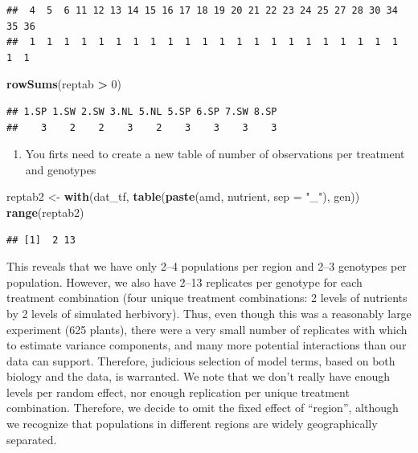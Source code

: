 \documentclass[
  12pt,
]{book}
\newenvironment{Shaded}{\begin{snugshade}}{\end{snugshade}}
\newcommand{\DataTypeTok}[1]{\textcolor[rgb]{0.13,0.29,0.53}{#1}}
\newcommand{\DecValTok}[1]{\textcolor[rgb]{0.00,0.00,0.81}{#1}}
\newcommand{\KeywordTok}[1]{\textcolor[rgb]{0.13,0.29,0.53}{\textbf{#1}}}
\newcommand{\NormalTok}[1]{#1}
\newcommand{\OperatorTok}[1]{\textcolor[rgb]{0.81,0.36,0.00}{\textbf{#1}}}
\newcommand{\StringTok}[1]{\textcolor[rgb]{0.31,0.60,0.02}{#1}}
\providecommand{\tightlist}{%
  \setlength{\itemsep}{0pt}\setlength{\parskip}{0pt}}
\begin{document}
\begin{verbatim}
##  4  5  6 11 12 13 14 15 16 17 18 19 20 21 22 23 24 25 27 28 30 34 35 36 
##  1  1  1  1  1  1  1  1  1  1  1  1  1  1  1  1  1  1  1  1  1  1  1  1
\end{verbatim}

\begin{Shaded}
\begin{Highlighting}[]
\KeywordTok{rowSums}\NormalTok{(reptab }\OperatorTok{\textgreater{}}\StringTok{ }\DecValTok{0}\NormalTok{)}
\end{Highlighting}
\end{Shaded}

\begin{verbatim}
## 1.SP 1.SW 2.SW 3.NL 5.NL 5.SP 6.SP 7.SW 8.SP 
##    3    2    2    3    2    3    3    3    3
\end{verbatim}

\begin{enumerate}
\def\labelenumi{\arabic{enumi}.}
\setcounter{enumi}{2}
\tightlist
\item
  You firts need to create a new table of number of observations per treatment and genotypes
\end{enumerate}

\begin{Shaded}
\begin{Highlighting}[]
\NormalTok{reptab2 \textless{}{-}}\StringTok{ }\KeywordTok{with}\NormalTok{(dat\_tf, }\KeywordTok{table}\NormalTok{(}\KeywordTok{paste}\NormalTok{(amd, nutrient, }\DataTypeTok{sep =} \StringTok{"\_"}\NormalTok{), gen))}
\KeywordTok{range}\NormalTok{(reptab2)}
\end{Highlighting}
\end{Shaded}

\begin{verbatim}
## [1]  2 13
\end{verbatim}

This reveals that we have only 2--4 populations per region and 2--3 genotypes per population. However, we also have 2--13 replicates per genotype for each treatment combination (four unique treatment combinations: 2 levels of nutrients by 2 levels of simulated herbivory). Thus, even though this was a reasonably large experiment (625 plants), there were a very small number of replicates with which to estimate variance components, and many more potential interactions than our data can support. Therefore, judicious selection of model terms, based on both biology and the data, is warranted. We note that we don't really have enough levels per random effect, nor enough replication per unique treatment combination. Therefore, we decide to omit the fixed effect of ``region'', although we recognize that populations in different regions are widely geographically separated.
\end{document}
